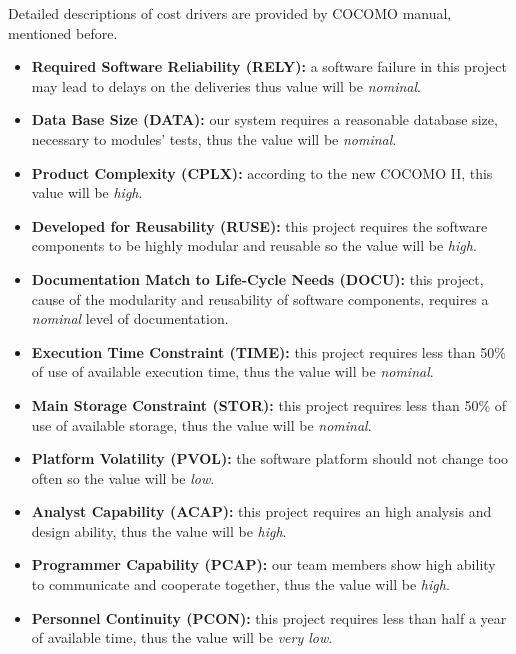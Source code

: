 Detailed descriptions of cost drivers are provided by COCOMO manual, mentioned before.

\begin{itemize}
	
	\item\textbf{Required Software Reliability (RELY):} a software failure in this project may lead to delays on the deliveries thus value will be \textit{nominal}.
	
	\item\textbf{Data Base Size (DATA):} our system requires a reasonable database size, necessary to modules' tests, thus the value will be \textit{nominal}.
	
	\item\textbf{Product Complexity (CPLX):} according to the new COCOMO II, this value will be \textit{high}.
	
	\item\textbf{Developed for Reusability (RUSE):}  this project requires the software components to be highly modular and reusable so the value will be \textit{high}.
	
	\item\textbf{Documentation Match to Life-Cycle Needs (DOCU):} this project, cause of the modularity and reusability of software components, requires a \textit{nominal} level of documentation.
	
	\item\textbf{Execution Time Constraint (TIME):} this project requires less than 50\% of use of available execution time, thus the value will be \textit{nominal}.
	
	\item\textbf{Main Storage Constraint (STOR):} this project requires less than 50\% of use of available storage, thus the value will be \textit{nominal}. 
	
	\item\textbf{Platform Volatility (PVOL):} the software platform should not change too often so the value will be \textit{low}.
	
	\item\textbf{Analyst Capability (ACAP):} this project requires an high analysis and design ability, thus the value will be \textit{high}.
	
	\item\textbf{Programmer Capability (PCAP):} our team members show high ability to communicate and cooperate together, thus the value will be \textit{high}.
	
	\item\textbf{Personnel Continuity (PCON):} this project requires less than half a year of available time, thus the value will be \textit{very low}.
	

\end{itemize}
